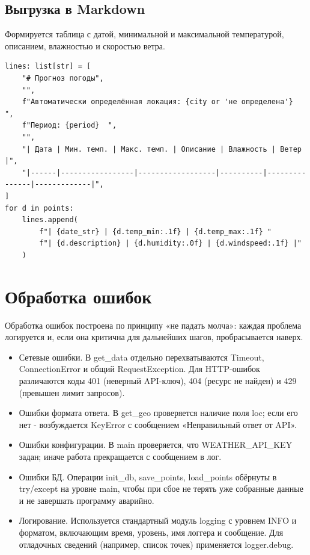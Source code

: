 \documentclass[oneside,a4paper,14pt]{extarticle}
\begin{document}
\subsection*{Выгрузка в Markdown}
Формируется таблица с датой, минимальной и максимальной температурой, описанием, влажностью и скоростью ветра.

\begin{small}
	\begin{verbatim}
lines: list[str] = [
    "# Прогноз погоды",
    "",
    f"Автоматически определённая локация: {city or 'не определена'}  ",
    f"Период: {period}  ",
    "",
    "| Дата | Мин. темп. | Макс. темп. | Описание | Влажность | Ветер |",
    "|------|-----------------|------------------|----------|---------------|-------------|",
]
for d in points:
    lines.append(
        f"| {date_str} | {d.temp_min:.1f} | {d.temp_max:.1f} "
        f"| {d.description} | {d.humidity:.0f} | {d.windspeed:.1f} |"
    )
\end{verbatim}
\end{small}

\section*{Обработка ошибок}
Обработка ошибок построена по принципу «не падать молча»: каждая проблема логируется и, если она критична для дальнейших шагов, пробрасывается наверх.

\begin{itemize}
	\item Сетевые ошибки. В get\_data отдельно перехватываются Timeout, ConnectionError и общий RequestException. Для HTTP-ошибок различаются коды 401 (неверный API-ключ), 404 (ресурс не найден) и 429 (превышен лимит запросов).
	\item Ошибки формата ответа. В get\_geo проверяется наличие поля loc; если его нет - возбуждается KeyError с сообщением «Неправильный ответ от API».
	\item Ошибки конфигурации. В main проверяется, что WEATHER\_API\_KEY задан; иначе работа прекращается с сообщением в лог.
	\item Ошибки БД. Операции init\_db, save\_points, load\_points обёрнуты в try/except на уровне main, чтобы при сбое не терять уже собранные данные и не завершать программу аварийно.
	\item Логирование. Используется стандартный модуль logging с уровнем INFO и форматом, включающим время, уровень, имя логгера и сообщение. Для отладочных сведений (например, список точек) применяется logger.debug.
\end{itemize}
\end{document}
